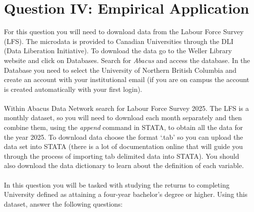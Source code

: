 \documentclass[letterpaper,12pt]{article}
\theoremstyle{dotlessS}
\begin{document}
\section*{Question IV: Empirical Application}
For this question you will need to download data from the Labour Force Survey (LFS). The microdata is provided to Canadian Universities through the DLI (Data Liberation Initiative). To download the data go to the Weller Library website and click on Databases. Search for \textit{Abacus} and access the database. In the Database you need to select the University of Northern British Columbia and create an account with your institutional email (if you are on campus the account is created automatically with your first login). \\
 \\
Within Abacus Data Network search for Labour Force Survey 2025. The LFS is a monthly dataset, so you will need to download each month separately and then combine them, using the \textit{append} command in STATA, to obtain all the data for the year 2025. To download data choose the format `.tab' so you can upload the data set into STATA (there is a lot of documentation online that will guide you through the process of importing tab delimited data into STATA). You should also download the data dictionary to learn about the definition of each variable.\\
\\
In this question you will be tasked with studying the returns to completing University defined as attaining a four-year bachelor's degree or higher. Using this dataset, answer the following questions:
\end{document}
